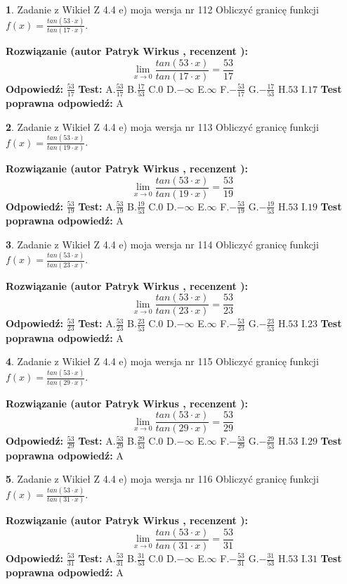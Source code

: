 \documentclass[12pt, a4paper]{article}
\theoremstyle{definition} %
\newtheorem{zad}{}
\newcommand{\zadStart}[1]{\begin{zad}#1\newline}
\newcommand{\zadStop}{\end{zad}}
\newcommand{\rozwStart}[2]{\noindent \textbf{Rozwiązanie (autor #1 , recenzent #2): }\newline}
\newcommand{\rozwStop}{\newline}
\newcommand{\odpStart}{\noindent \textbf{Odpowiedź:}\newline}
\newcommand{\odpStop}{\newline}
\newcommand{\testStart}{\noindent \textbf{Test:}\newline}
\newcommand{\testStop}{\newline}
\newcommand{\kluczStart}{\noindent \textbf{Test poprawna odpowiedź:}\newline}
\newcommand{\kluczStop}{\newline}
\begin{document}
\zadStart{Zadanie z Wikieł Z 4.4 e) moja wersja nr 112}
Obliczyć granicę funkcji $f(x)=\frac{tan(53\cdot x)}{tan(17\cdot x)}$.
\zadStop
\rozwStart{Patryk Wirkus}{}
$$\lim\limits_{x\to 0}\frac{tan(53\cdot x)}{tan(17\cdot x)}=
\frac{53}{17}$$
\rozwStop
\odpStart
$\frac{53}{17}$
\odpStop
\testStart
A.$\frac{53}{17}$
B.$\frac{17}{53}$
C.$0$
D.$-\infty$
E.$\infty$
F.$-\frac{53}{17}$
G.$-\frac{17}{53}$
H.$53$
I.$17$
\testStop
\kluczStart
A
\kluczStop



\zadStart{Zadanie z Wikieł Z 4.4 e) moja wersja nr 113}
Obliczyć granicę funkcji $f(x)=\frac{tan(53\cdot x)}{tan(19\cdot x)}$.
\zadStop
\rozwStart{Patryk Wirkus}{}
$$\lim\limits_{x\to 0}\frac{tan(53\cdot x)}{tan(19\cdot x)}=
\frac{53}{19}$$
\rozwStop
\odpStart
$\frac{53}{19}$
\odpStop
\testStart
A.$\frac{53}{19}$
B.$\frac{19}{53}$
C.$0$
D.$-\infty$
E.$\infty$
F.$-\frac{53}{19}$
G.$-\frac{19}{53}$
H.$53$
I.$19$
\testStop
\kluczStart
A
\kluczStop



\zadStart{Zadanie z Wikieł Z 4.4 e) moja wersja nr 114}
Obliczyć granicę funkcji $f(x)=\frac{tan(53\cdot x)}{tan(23\cdot x)}$.
\zadStop
\rozwStart{Patryk Wirkus}{}
$$\lim\limits_{x\to 0}\frac{tan(53\cdot x)}{tan(23\cdot x)}=
\frac{53}{23}$$
\rozwStop
\odpStart
$\frac{53}{23}$
\odpStop
\testStart
A.$\frac{53}{23}$
B.$\frac{23}{53}$
C.$0$
D.$-\infty$
E.$\infty$
F.$-\frac{53}{23}$
G.$-\frac{23}{53}$
H.$53$
I.$23$
\testStop
\kluczStart
A
\kluczStop



\zadStart{Zadanie z Wikieł Z 4.4 e) moja wersja nr 115}
Obliczyć granicę funkcji $f(x)=\frac{tan(53\cdot x)}{tan(29\cdot x)}$.
\zadStop
\rozwStart{Patryk Wirkus}{}
$$\lim\limits_{x\to 0}\frac{tan(53\cdot x)}{tan(29\cdot x)}=
\frac{53}{29}$$
\rozwStop
\odpStart
$\frac{53}{29}$
\odpStop
\testStart
A.$\frac{53}{29}$
B.$\frac{29}{53}$
C.$0$
D.$-\infty$
E.$\infty$
F.$-\frac{53}{29}$
G.$-\frac{29}{53}$
H.$53$
I.$29$
\testStop
\kluczStart
A
\kluczStop



\zadStart{Zadanie z Wikieł Z 4.4 e) moja wersja nr 116}
Obliczyć granicę funkcji $f(x)=\frac{tan(53\cdot x)}{tan(31\cdot x)}$.
\zadStop
\rozwStart{Patryk Wirkus}{}
$$\lim\limits_{x\to 0}\frac{tan(53\cdot x)}{tan(31\cdot x)}=
\frac{53}{31}$$
\rozwStop
\odpStart
$\frac{53}{31}$
\odpStop
\testStart
A.$\frac{53}{31}$
B.$\frac{31}{53}$
C.$0$
D.$-\infty$
E.$\infty$
F.$-\frac{53}{31}$
G.$-\frac{31}{53}$
H.$53$
I.$31$
\testStop
\kluczStart
A
\kluczStop
\end{document}
